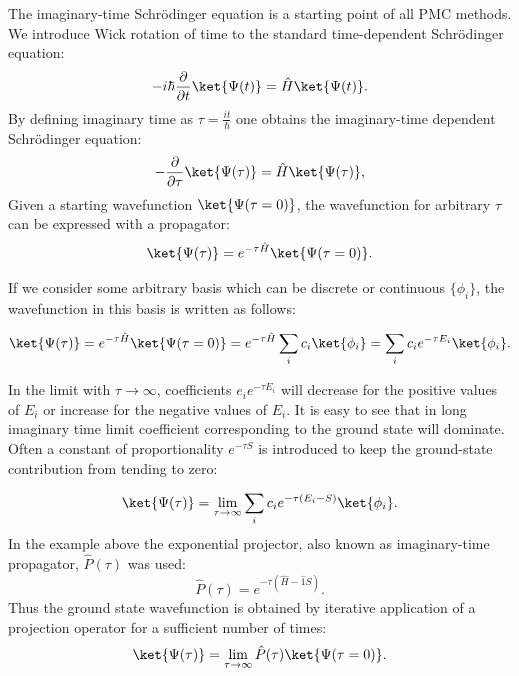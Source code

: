 \documentclass[twoside,english]{uiofysmaster}
\begin{document}
The imaginary-time Schr\"{o}dinger equation is a starting point of all PMC methods. We introduce Wick rotation of time to the standard time-dependent Schr\"{o}dinger equation:
\begin{equation}
-i\hbar \frac{\partial}{\partial t} \ket{\Psi(t)}= \hat{H} \ket{\Psi(t)}.
\end{equation}
By defining imaginary time as $\tau = \frac{it}{\hbar}$ one obtains the imaginary-time dependent Schr\"{o}dinger equation:
\begin{equation}\label{ITSE}
-\frac{\partial}{\partial \tau} \ket{\Psi(\tau)}= \hat{H} \ket{\Psi(\tau)},
\end{equation}
Given a starting wavefunction $\ket{\Psi(\tau = 0)}$, the wavefunction for arbitrary $\tau$ can be expressed with a propagator:
\begin{equation}\label{SEsolutionpropagator}
\ket{\Psi(\tau)}= e^{-\tau \hat{H}}\ket{\Psi(\tau = 0)}.
\end{equation}

If we consider some arbitrary basis which can be discrete or continuous $\{\phi_i\}$, the wavefunction in this basis is written as follows:

\begin{equation}
\ket{\Psi(\tau)}= e^{-\tau \hat{H}}\ket{\Psi(\tau = 0)} = e^{-\tau \hat{H}}\sum_i c_i \ket{\phi_i} = \sum_i c_i e^{-\tau E_i} \ket{\phi_i}. 
\end{equation}

In the limit with $\tau \rightarrow \infty$, coefficients $ e_i e^{-\tau E_i}$ will decrease for the positive values of $E_i$ or increase for the negative values of $E_i$. It is easy to see that in long imaginary time limit coefficient corresponding to the ground state will dominate. Often a constant of proportionality $e^{-\tau S}$ is introduced to keep the ground-state contribution from tending to zero:

\[
\ket{\Psi(\tau)}= \lim_{\tau\to\infty} \sum_i c_i e^{-\tau (E_i - S)} \ket{\phi_i}. 
\]
In the example above the exponential projector, also known as imaginary-time propagator, $\hat{P}(\tau)$ was used:
\[
\hat{P}(\tau)= e^{-\tau (\hat{H} - \hat{1}S)} .
\]
Thus the ground state wavefunction is obtained by iterative application of a projection operator for a sufficient number of times: 
\begin{equation}\label{MCPMC}
\ket{\Psi(\tau)}= \lim_{\tau\to\infty} \hat{P}(\tau) \ket{\Psi(\tau = 0)}. 
\end{equation}
\end{document}
